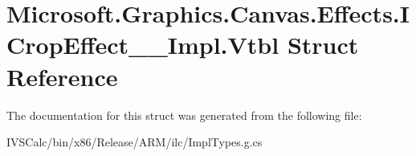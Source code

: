 \hypertarget{struct_microsoft_1_1_graphics_1_1_canvas_1_1_effects_1_1_i_crop_effect_____impl_1_1_vtbl}{}\section{Microsoft.\+Graphics.\+Canvas.\+Effects.\+I\+Crop\+Effect\+\_\+\+\_\+\+Impl.\+Vtbl Struct Reference}
\label{struct_microsoft_1_1_graphics_1_1_canvas_1_1_effects_1_1_i_crop_effect_____impl_1_1_vtbl}


The documentation for this struct was generated from the following file\+:\begin{DoxyCompactItemize}
\item 
I\+V\+S\+Calc/bin/x86/\+Release/\+A\+R\+M/ilc/Impl\+Types.\+g.\+cs\end{DoxyCompactItemize}
